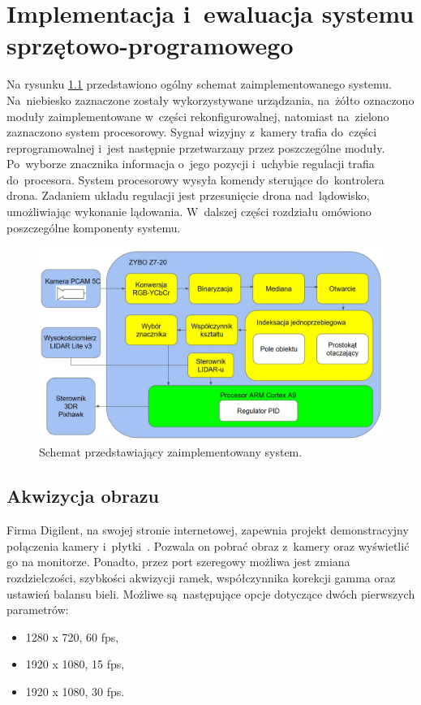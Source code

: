 \chapter{Implementacja i~ewaluacja systemu sprzętowo-programowego}

Na rysunku \ref{fig:system} przedstawiono ogólny schemat zaimplementowanego systemu. 
Na~niebiesko zaznaczone zostały wykorzystywane urządzania, na~żółto oznaczono moduły zaimplementowane w~części rekonfigurowalnej, natomiast na~zielono zaznaczono system procesorowy. 
Sygnał wizyjny z~kamery trafia do~części reprogramowalnej i~jest następnie przetwarzany przez poszczególne moduły. 
Po~wyborze znacznika informacja o~jego pozycji i~uchybie regulacji trafia do~procesora. 
System procesorowy wysyła komendy sterujące do~kontrolera drona. 
Zadaniem układu regulacji jest przesunięcie drona nad~lądowisko, umożliwiając wykonanie lądowania.
W~dalszej części rozdziału omówiono poszczególne komponenty systemu. 


\begin{figure}[h]
	\centering
	\includegraphics[width=\textwidth]{system.jpg}
	\caption{Schemat przedstawiający zaimplementowany system.}
	\label{fig:system}
\end{figure} 

\section{Akwizycja obrazu}
\label{sec:integracja_uklad_kamera}
Firma Digilent, na swojej stronie internetowej, zapewnia projekt demonstracyjny połączenia kamery i~płytki~\cite{projektPCAM}. 
Pozwala on pobrać obraz z~kamery oraz wyświetlić go na monitorze.
Ponadto, przez port szeregowy możliwa jest zmiana rozdzielczości, szybkości akwizycji ramek, współczynnika korekcji gamma oraz ustawień balansu bieli. 
Możliwe są~następujące opcje dotyczące dwóch pierwszych parametrów:
\begin{itemize}
	\item 1280 x 720, 60 fps,
	\item 1920 x 1080, 15 fps,
	\item 1920 x 1080, 30 fps.
\end{itemize}

